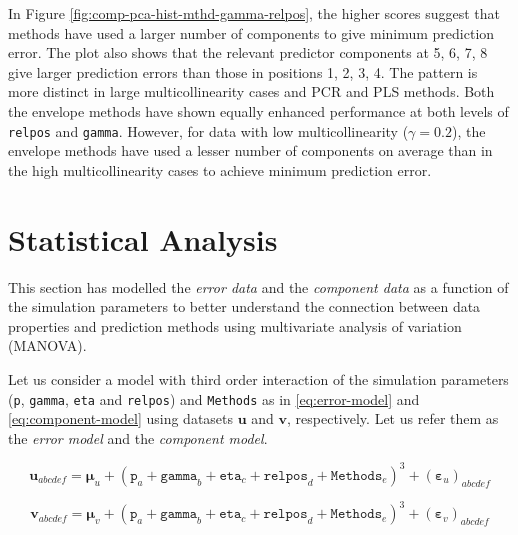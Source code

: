 \documentclass[review]{elsarticle}
\providecommand{\tightlist}{%
  \setlength{\itemsep}{0pt}\setlength{\parskip}{0pt}}
\begin{document}
In Figure \ref{fig:comp-pca-hist-mthd-gamma-relpos}, the higher scores suggest that methods have used a larger number of components to give minimum prediction error. The plot also shows that the relevant predictor components at 5, 6, 7, 8 give larger prediction errors than those in positions 1, 2, 3, 4. The pattern is more distinct in large multicollinearity cases and PCR and PLS methods. Both the envelope methods have shown equally enhanced performance at both levels of \texttt{relpos} and \texttt{gamma}. However, for data with low multicollinearity (\(\gamma = 0.2\)), the envelope methods have used a lesser number of components on average than in the high multicollinearity cases to achieve minimum prediction error.

\hypertarget{statistical-analysis}{%
\section{Statistical Analysis}\label{statistical-analysis}}

This section has modelled the \emph{error data} and the \emph{component data} as a function of the simulation parameters to better understand the connection between data properties and prediction methods using multivariate analysis of variation (MANOVA).

Let us consider a model with third order interaction of the simulation parameters (\texttt{p}, \texttt{gamma}, \texttt{eta} and \texttt{relpos}) and \texttt{Methods} as in \eqref{eq:error-model} and \eqref{eq:component-model} using datasets \(\mathbf{u}\) and \(\mathbf{v}\), respectively. Let us refer them as the \emph{error model} and the \emph{component model}.

\begin{description}
\tightlist
\item[\textbf{Error Model:}]
\begin{equation}\mathbf{u}_{abcdef} = \boldsymbol{\mu}_u +
  (\texttt{p}_a + \texttt{gamma}_b + \texttt{eta}_c +
\texttt{relpos}_d + \texttt{Methods}_e)^3 +
  \left(\boldsymbol{\varepsilon}_u\right)_{abcdef}
  \label{eq:error-model}
  \end{equation}
\item[\textbf{Component Model:}]
\begin{equation}\mathbf{v}_{abcdef} = \boldsymbol{\mu}_v +
  (\texttt{p}_a + \texttt{gamma}_b + \texttt{eta}_c +
\texttt{relpos}_d + \texttt{Methods}_e)^3 +
  \left(\boldsymbol{\varepsilon}_v\right)_{abcdef}
  \label{eq:component-model}
  \end{equation}
\end{description}
\end{document}
